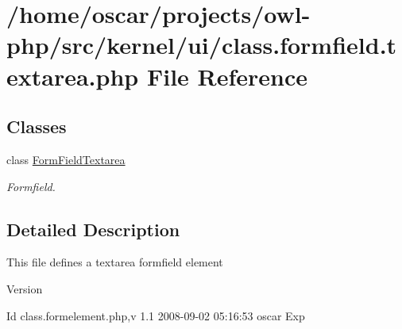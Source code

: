 \section{/home/oscar/projects/owl-\/php/src/kernel/ui/class.formfield.textarea.php File Reference}
\label{class_8formfield_8textarea_8php}
\subsection*{Classes}
\begin{DoxyCompactItemize}
\item 
class \hyperlink{classFormFieldTextarea}{FormFieldTextarea}
\begin{DoxyCompactList}\small\item\em Formfield. \item\end{DoxyCompactList}\end{DoxyCompactItemize}


\subsection{Detailed Description}
This file defines a textarea formfield element \begin{DoxyVersion}{Version}

\end{DoxyVersion}
\begin{DoxyParagraph}{Id}
class.formelement.php,v 1.1 2008-\/09-\/02 05:16:53 oscar Exp 
\end{DoxyParagraph}
